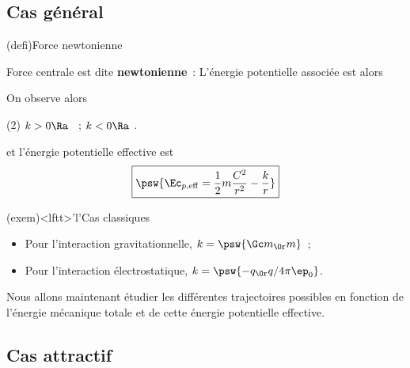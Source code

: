 \documentclass[../../main/main.tex]{subfiles}
\begin{document}
\subsection{Cas général}
\begin{tcb*}(defi){Force newtonienne}
	\begin{isd}
		Force centrale est dite \textbf{newtonienne}~:
		\psw{
			\[\boxed{\Ff = -\frac{k}{r^2}\ur}\]
		}
		\vspace{-15pt}
		\tcblower
		L'énergie potentielle associée est alors
		\psw{\[\boxed{\Ec_p(r) = -\frac{k}{r}}\]}
		\vspace{-15pt}
	\end{isd}
	On observe alors
	\begin{tasks}[label=$\diamond$](2)
		\task $k>0 \Ra$ ~;
		\task $k<0 \Ra$ .
	\end{tasks}
	et l'énergie potentielle effective est
	\[\boxed{\psw{\Ec_{p,\rm eff} = \frac{1}{2}m\frac{C^2}{r^2} - \frac{k}{r}}}\]
\end{tcb*}

\begin{tcb*}(exem)<lftt>'l'{Cas classiques}
	\begin{itemize}
		\item Pour l'interaction gravitationnelle, $k = \psw{\Gc m_\Or m}$~;
		\item Pour l'interaction électrostatique, $k = \psw{-q_\Or q/4\pi\ep_0}$.
	\end{itemize}
\end{tcb*}

Nous allons maintenant étudier les différentes trajectoires possibles en
fonction de l'énergie mécanique totale et de cette énergie potentielle
effective.

\subsection{Cas attractif}
\end{document}

